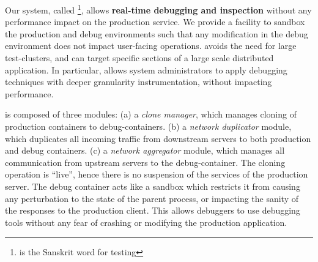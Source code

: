 
Our system, called \parikshan\footnote{\parikshan is the Sanskrit word for  testing}, allows \textbf{real-time debugging and inspection} without any performance impact on the production service. 
We provide a facility to sandbox the production and debug environments such that any modification in the debug environment does not impact user-facing operations.
\parikshan avoids the need for large test-clusters, and can target specific sections of a large scale distributed application.
In particular, \parikshan allows system administrators to apply debugging techniques with deeper granularity instrumentation, without impacting performance.

\parikshan is composed of three modules:
(a) a \textit{clone manager}, which manages cloning of production containers to debug-containers.
(b) a \textit{network duplicator} module, which duplicates all incoming traffic from downstream servers to both production and debug containers.
(c) a \textit{network aggregator} module, which manages all communication from upstream servers to the debug-container.
The cloning operation is ``live'', hence there is no suspension of the services of the production server.
The debug container acts like a sandbox which restricts it from causing any perturbation to the state of the parent process, or impacting the sanity of the responses to the production client. 
This allows debuggers to use debugging tools without any fear of crashing or modifying the production application.

